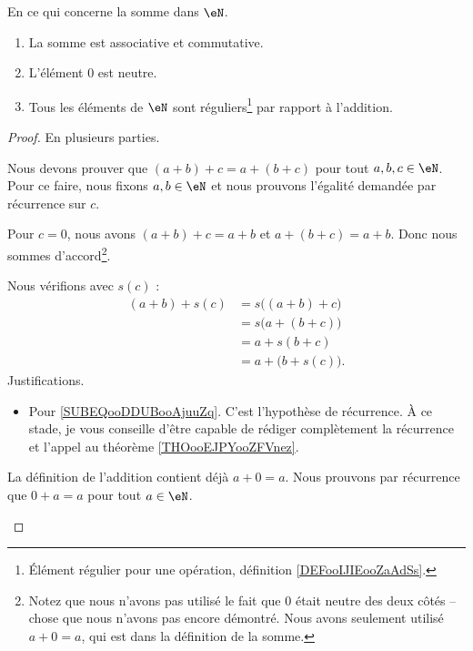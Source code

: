 \begin{proposition}     \label{PROPooTLTSooGNMTmV}
	En ce qui concerne la somme dans \( \eN\).
	\begin{enumerate}
		\item       \label{ITEMooIFFPooXfftfG}
		      La somme est associative et commutative.
		\item       \label{ITEMooSGRVooPAVFYK}
		      L'élément \( 0\) est neutre.
		\item       \label{ITEMooNUTHooJWWzGv}
		      Tous les éléments de \( \eN\) sont réguliers\footnote{Élément régulier pour une opération, définition \ref{DEFooIJIEooZaAdSs}.} par rapport à l'addition.
	\end{enumerate}
\end{proposition}

\begin{proof}
	En plusieurs parties.
	\begin{subproof}
		\spitem[Associative]
		Nous devons prouver que \( (a+b)+c=a+(b+c)\) pour tout \( a,b,c\in \eN\). Pour ce faire, nous fixons \( a,b\in\eN\) et nous prouvons l'égalité demandée par récurrence sur \( c\).

		Pour \( c=0\), nous avons \( (a+b)+c=a+b\) et \( a+(b+c)=a+b\). Donc nous sommes d'accord\footnote{Notez que nous n'avons pas utilisé le fait que \( 0\) était neutre des deux côtés -- chose que nous n'avons pas encore démontré. Nous avons seulement utilisé \( a+0=a\), qui est dans la définition de la somme.}.

		Nous vérifions avec \( s(c)\) :
		\begin{subequations}
			\begin{align}
				(a+b)+s(c) & =s\big( (a+b)+c \big)                              \\
				           & =s\big( a+(b+c) \big)  \label{SUBEQooDDUBooAjuuZq} \\
				           & =a+s(b+c)                                          \\
				           & =a+\big( b+s(c) \big).
			\end{align}
		\end{subequations}
		Justifications.
		\begin{itemize}
			\item Pour \eqref{SUBEQooDDUBooAjuuZq}. C'est l'hypothèse de récurrence. À ce stade, je vous conseille d'être capable de rédiger complètement la récurrence et l'appel au théorème \ref{THOooEJPYooZFVnez}.
		\end{itemize}
		\spitem[Neutre]
		La définition de l'addition contient déjà \( a+0=a\). Nous prouvons par récurrence que \( 0+a=a\) pour tout \( a\in \eN\).


\end{subproof}
\end{proof}
